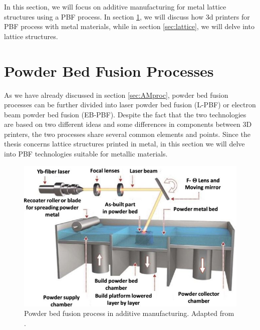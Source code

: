 \setlength{\tabcolsep}{10pt}
In this section, we will focus on additive manufacturing for metal lattice structures using a PBF process. In section \ref{sec:pbf_proc}, we will discuss how 3d printers for PBF process with metal materials, while in section \ref{sec:lattice}, we will delve into lattice structures.
\section{Powder Bed Fusion Processes}\label{sec:pbf_proc}
As we have already discussed in section \ref{sec:AMproc}, powder bed fusion processes can be further divided into laser powder bed fusion (L-PBF) or electron beam powder bed fusion (EB-PBF). Despite the fact that the two technologies are based on two different ideas and some differences in components between 3D printers, the two processes share several common elements and points. Since the thesis concerns lattice structures printed in metal, in this section we will delve into PBF technologies suitable for metallic materials. 
\begin{figure}[H]
    \centering
    \includegraphics[scale=1.3]{Images/PBF.jpg}
    \caption[PBF in AM.]{Powder bed fusion process in additive manufacturing. Adapted from \cite{ozel_focus_2020}.}
    \label{fig:PBF}
\end{figure}

